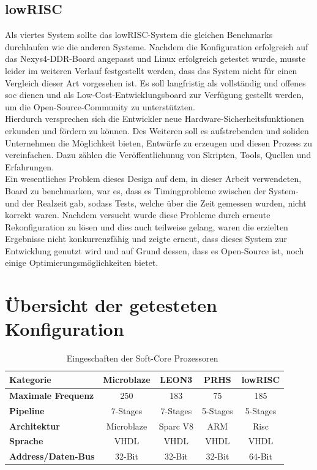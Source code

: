 \subsection{lowRISC}\label{kap:lowrisc}
Als viertes System sollte das lowRISC-System die gleichen Benchmarks durchlaufen wie die anderen Systeme. Nachdem die Konfiguration erfolgreich auf das Nexys4-DDR-Board angepasst
und Linux erfolgreich getestet wurde, musste leider im weiteren Verlauf festgestellt werden, dass das System nicht für einen Vergleich dieser Art vorgesehen ist. Es soll langfristig als vollständig
und offenes \ac{soc} dienen und als Low-Cost-Entwicklungsboard zur Verfügung gestellt werden, um die Open-Source-Community zu unterstützten.\\
Hierdurch versprechen sich die Entwickler neue Hardware-Sicherheitsfunktionen erkunden und fördern zu können. Des Weiteren soll es aufstrebenden und soliden Unternehmen die Möglichkeit bieten,
Entwürfe zu erzeugen und diesen Prozess zu vereinfachen. Dazu zählen die Veröffentlichunug von Skripten, Tools, Quellen und Erfahrungen.\\
Ein wesentliches Problem dieses Design auf dem, in dieser Arbeit verwendeten, Board zu benchmarken, war es, dass es Timingprobleme zwischen der System- und der Realzeit gab, sodass Tests,
welche über die Zeit gemessen wurden, nicht korrekt waren. Nachdem versucht wurde diese Probleme durch erneute Rekonfiguration zu lösen und dies auch teilweise gelang, waren die erzielten Ergebnisse
nicht konkurrenzfähig und zeigte erneut, dass dieses System zur Entwicklung genutzt wird und auf Grund dessen, dass es Open-Source ist, noch einige Optimierungsmöglichkeiten bietet.\\

\section{Übersicht der getesteten Konfiguration}\label{kap:getestetekonfiguration}


\begin{table}[H]
\centering
\begin{tabular}{|l|c|c|c|c|}
  \hline
  \textbf{Kategorie} & \textbf{Microblaze} & \textbf{LEON3}& \textbf{PRHS}& \textbf{lowRISC}\\
  \hline
  \textbf{Maximale Frequenz} &250 & 183 & 75 & 185\\
  \hline
  \textbf{Pipeline} & 7-Stages & 7-Stages & 5-Stages & 5-Stages\\
  \hline
  \textbf{Architektur} & Microblaze & Sparc V8  & ARM &  Risc\\
  \hline
  \textbf{Sprache} & VHDL & VHDL & VHDL & VHDL\\
    \hline
  \textbf{Address/Daten-Bus} & 32-Bit & 32-Bit & 32-Bit & 64-Bit\\
      \hline
\end{tabular}
  \caption{Eingeschaften der Soft-Core Prozessoren~\cite{comparison}}
 \label{tab:features}
  \end{table}

